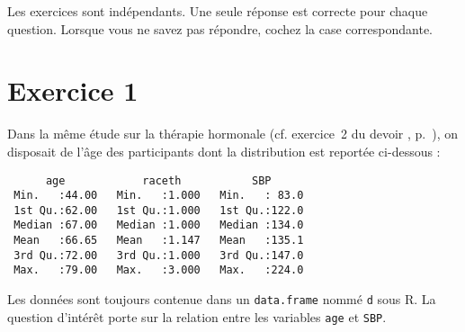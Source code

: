 \documentclass[11pt]{report}
\theoremstyle{definition}
\begin{document}
Les exercices sont indépendants. Une seule réponse est correcte pour chaque
question. Lorsque vous ne savez pas répondre, cochez la case correspondante.

\section*{Exercice 1}
Dans la même étude sur la thérapie hormonale (cf. exercice~2 du devoir , p.~\pageref{dev3:exo2}), on disposait de l'âge des participants dont la
distribution est reportée ci-dessous :
\begin{verbatim}
      age            raceth           SBP       
 Min.   :44.00   Min.   :1.000   Min.   : 83.0  
 1st Qu.:62.00   1st Qu.:1.000   1st Qu.:122.0  
 Median :67.00   Median :1.000   Median :134.0  
 Mean   :66.65   Mean   :1.147   Mean   :135.1  
 3rd Qu.:72.00   3rd Qu.:1.000   3rd Qu.:147.0  
 Max.   :79.00   Max.   :3.000   Max.   :224.0  
\end{verbatim}
Les données sont toujours contenue dans un \texttt{data.frame} nommé
\texttt{d} sous R. La question d'intérêt porte sur la relation entre les
variables \texttt{age} et \texttt{SBP}.
\end{document}
